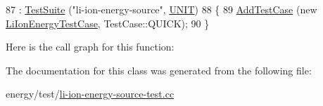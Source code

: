 \begin{DoxyCode}
87   : \hyperlink{classns3_1_1TestSuite_a904b0c40583b744d30908aeb94636d1a}{TestSuite} (\textcolor{stringliteral}{"li-ion-energy-source"}, \hyperlink{classns3_1_1TestSuite_a1ebfcab34ec8161e085e8e3a1855eae0a3885375a3787abf60431f8454b3cadbd}{UNIT})
88 \{
89   \hyperlink{classns3_1_1TestCase_a3718088e3eefd5d6454569d2e0ddd835}{AddTestCase} (\textcolor{keyword}{new} \hyperlink{classLiIonEnergyTestCase}{LiIonEnergyTestCase}, TestCase::QUICK);
90 \}
\end{DoxyCode}


Here is the call graph for this function\+:




The documentation for this class was generated from the following file\+:\begin{DoxyCompactItemize}
\item 
energy/test/\hyperlink{li-ion-energy-source-test_8cc}{li-\/ion-\/energy-\/source-\/test.\+cc}\end{DoxyCompactItemize}
